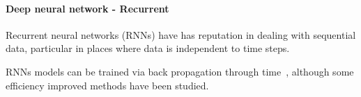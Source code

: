 \paragraph{Deep neural network - Recurrent}
Recurrent neural networks (RNNs) have has reputation in dealing with sequential data, particular in places where data is independent to time steps. 


RNNs models can be trained via back propagation through time~\cite{Goodfellow-et-al-2016}, although some efficiency improved methods have been studied.~\cite{963769,neco.1989,Gomez:2008:ANE:1390681.1390712}
